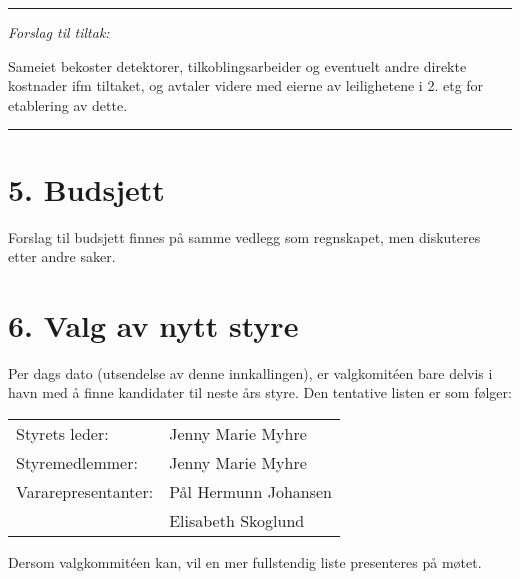 \documentclass[12pt]{article}
\begin{document}
{\rule{\textwidth}{0.3pt}}

{\em Forslag til tiltak:}

Sameiet bekoster detektorer, tilkoblingsarbeider og eventuelt andre direkte kostnader ifm tiltaket, og avtaler videre med eierne av leilighetene i 2. etg for etablering av dette.\\
{\rule{\textwidth}{0.3pt}}

\section*{5. Budsjett}

Forslag til budsjett finnes på samme vedlegg som regnskapet, men diskuteres etter andre saker.

\section*{6. Valg av nytt styre}

Per dags dato (utsendelse av denne innkallingen), er valgkomitéen bare delvis i havn med å finne
kandidater til neste års styre. Den tentative listen er som følger:

\begin{tabular}{ll}
  Styrets leder: & Jenny Marie Myhre
  \vspace{1ex}\\
  Styremedlemmer: & Jenny Marie Myhre
  \vspace{1ex}\\
  Vararepresentanter: & Pål Hermunn Johansen\\
  & Elisabeth Skoglund
\end{tabular}

Dersom valgkommitéen kan, vil en mer fullstendig liste presenteres på møtet.
\end{document}
